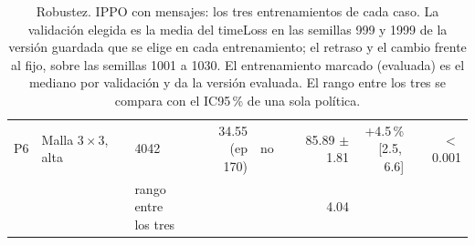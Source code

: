\begin{table}[H]
\begin{tabular}{lllrlrrr}
P6 & \makecell[l]{Malla $3 \times 3$,\\{}alta} & 4042 & \makecell[r]{34.55\\{}(ep 170)} & no & \makecell[r]{85.89\\{}$\pm$ 1.81} & \makecell[r]{+4.5\,\%\\{}[2.5,\,6.6]} & $<$\,0.001 \\
 & & \makecell[l]{rango entre\\{}los tres} & & & 4.04 & & \\
\bottomrule
\end{tabular}
\caption[Robustez: entrenamientos de IPPO con mensajes]{Robustez. IPPO con mensajes: los tres entrenamientos de cada caso. La validación elegida es la media del timeLoss en las semillas 999 y 1999 de la versión guardada que se elige en cada entrenamiento; el retraso y el cambio frente al fijo, sobre las semillas 1001 a 1030. El entrenamiento marcado (evaluada) es el mediano por validación y da la versión evaluada. El rango entre los tres se compara con el IC95\,\% de una sola política.}
\label{tab:robustez-veredicto-bases-ippo-vecinos}
\end{table}

